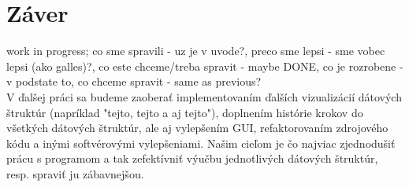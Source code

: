\section{Záver}
work in progress; co sme spravili - uz je v uvode?, preco sme lepsi - sme vobec lepsi (ako galles)?, co este chceme/treba spravit - maybe DONE, co je rozrobene - v podstate to, co chceme spravit - same as previous?
\\
V ďalšej práci sa budeme zaoberať implementovaním ďalších vizualizácií dátových
štruktúr (napríklad "tejto, tejto a aj tejto"), doplnením histórie krokov do
všetkých dátových štruktúr, ale aj vylepšením GUI, refaktorovaním zdrojového
kódu a inými softvérovými vylepšeniami. Našim cieľom je čo najviac zjednodušiť
prácu s programom a tak zefektívniť výučbu jednotlivých dátových štruktúr, resp.
spraviť ju zábavnejšou.

